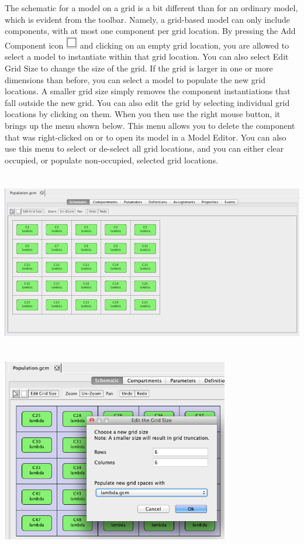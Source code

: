 \documentclass[titlepage,11pt]{article}
\begin{document}
The schematic for a model on a grid is a bit different than for an ordinary model, which is evident from the toolbar.  Namely, a grid-based model can only include components, with at most one component per grid location.  By pressing the Add Component icon \includegraphics{../gui/icons/modelview/add_component_selected} and clicking on an empty grid location, you are allowed to select a model to instantiate within that grid location.  You can also select Edit Grid Size to change the size of the grid.  If the grid is larger in one or more dimensions than before, you can select a model to populate the new grid locations.  A smaller grid size simply removes the component instantiations that fall outside the new grid.  You can also edit the grid by selecting individual grid locations by clicking on them.  When you then use the right mouse button, it brings up the menu shown below.  This menu allows you to delete the component that was right-clicked on or to open its model in a Model Editor.  You can also use this menu to select or de-select all grid locations, and you can either clear occupied, or populate non-occupied, selected grid locations.

\begin{center}
\includegraphics[height=80mm]{screenshots/gridModel}
\end{center}

\begin{center}
\includegraphics[height=80mm]{screenshots/editGridSize}
\end{center}
\end{document}
